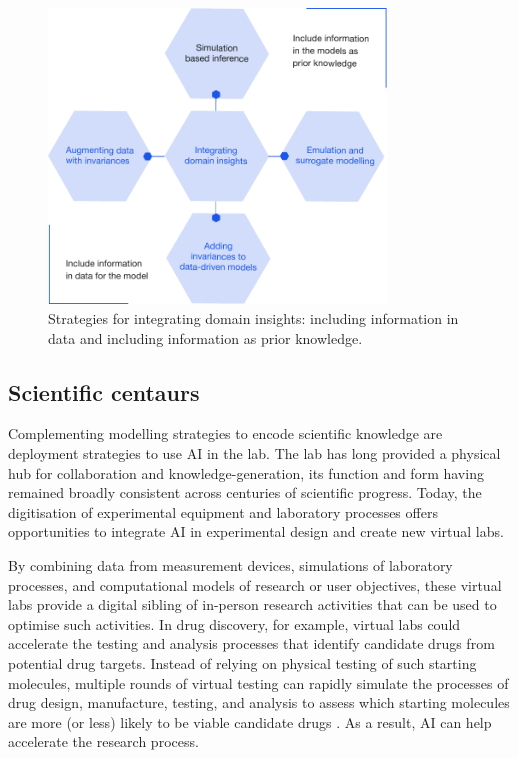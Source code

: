 \begin{figure}
\begin{center}
\includegraphics[width=0.8\textwidth]{media/figure-2.pdf}
\end{center}
\caption{Strategies for integrating domain insights: including information in data and including information as prior knowledge.}
\end{figure}

\subsection{Scientific centaurs}\label{scientific-centaurs}

Complementing modelling strategies to encode scientific knowledge are
deployment strategies to use AI in the lab. The lab has long provided a
physical hub for collaboration and knowledge-generation, its function
and form having remained broadly consistent across centuries of
scientific progress. Today, the digitisation of experimental equipment
and laboratory processes offers opportunities to integrate AI in
experimental design and create new virtual labs.

By combining data from measurement devices, simulations of laboratory
processes, and computational models of research or user objectives,
these virtual labs provide a digital sibling of in-person research
activities that can be used to optimise such activities. In drug
discovery, for example, virtual labs could accelerate the testing and
analysis processes that identify candidate drugs from potential drug
targets. Instead of relying on physical testing of such starting
molecules, multiple rounds of virtual testing can rapidly simulate the
processes of drug design, manufacture, testing, and analysis to assess
which starting molecules are more (or less) likely to be viable
candidate drugs \cite{Klami-virtual22}.
As a result, AI can help accelerate the research process.

